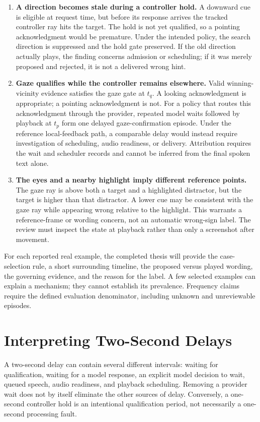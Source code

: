 \begin{enumerate}
\item \textbf{A direction becomes stale during a controller hold.} A downward cue is eligible at request time, but before its response arrives the tracked controller ray hits the target. The hold is not yet qualified, so a pointing acknowledgment would be premature. Under the intended policy, the search direction is suppressed and the hold gate preserved. If the old direction actually plays, the finding concerns admission or scheduling; if it was merely proposed and rejected, it is not a delivered wrong hint.
\item \textbf{Gaze qualifies while the controller remains elsewhere.} Valid winning-vicinity evidence satisfies the gaze gate at $t_q$. A looking acknowledgment is appropriate; a pointing acknowledgment is not. For a policy that routes this acknowledgment through the provider, repeated model waits followed by playback at $t_p$ form one delayed gaze-confirmation episode. Under the reference local-feedback path, a comparable delay would instead require investigation of scheduling, audio readiness, or delivery. Attribution requires the wait and scheduler records and cannot be inferred from the final spoken text alone.
\item \textbf{The eyes and a nearby highlight imply different reference points.} The gaze ray is above both a target and a highlighted distractor, but the target is higher than that distractor. A lower cue may be consistent with the gaze ray while appearing wrong relative to the highlight. This warrants a reference-frame or wording concern, not an automatic wrong-sign label. The review must inspect the state at playback rather than only a screenshot after movement.
\end{enumerate}

For each reported real example, the completed thesis will provide the case-selection rule, a short surrounding timeline, the proposed versus played wording, the governing evidence, and the reason for the label. A few selected examples can explain a mechanism; they cannot establish its prevalence. Frequency claims require the defined evaluation denominator, including unknown and unreviewable episodes.

\section{Interpreting Two-Second Delays}
A two-second delay can contain several different intervals: waiting for qualification, waiting for a model response, an explicit model decision to wait, queued speech, audio readiness, and playback scheduling. Removing a provider wait does not by itself eliminate the other sources of delay. Conversely, a one-second controller hold is an intentional qualification period, not necessarily a one-second processing fault.

